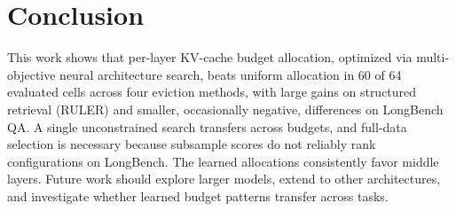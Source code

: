 \documentclass[11pt]{article}
\begin{document}
\section{Conclusion}

This work shows that per-layer KV-cache budget allocation, optimized via multi-objective neural architecture search, beats uniform allocation in 60 of 64 evaluated cells across four eviction methods, with large gains on structured retrieval (RULER) and smaller, occasionally negative, differences on LongBench QA. A single unconstrained search transfers across budgets, and full-data selection is necessary because subsample scores do not reliably rank configurations on LongBench. The learned allocations consistently favor middle layers. Future work should explore larger models, extend to other architectures, and investigate whether learned budget patterns transfer across tasks.

\FloatBarrier




\end{document}

